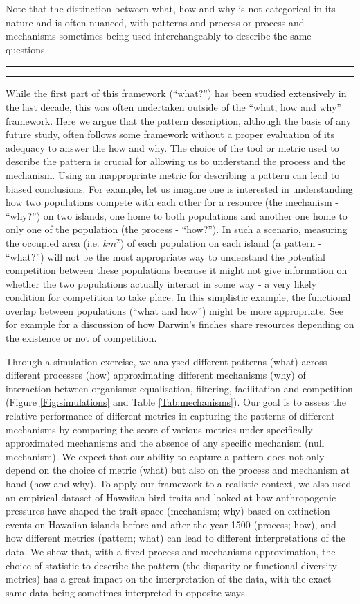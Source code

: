 \documentclass[12pt,letterpaper]{article}
\begin{document}
Note that the distinction between what, how and why is not categorical in its nature and is often nuanced, with patterns and process or process and mechanisms sometimes being used interchangeably to describe the same questions.

\bigskip
\hrule
\hrule
\bigskip

While the first part of this framework (``what?'') has been studied extensively in the last decade, this was often undertaken outside of the ``what, how and why'' framework.
Here we argue that the pattern description, although the basis of any future study, often follows some framework without a proper evaluation of its adequacy to answer the how and why.
The choice of the tool or metric used to describe the pattern is crucial for allowing us to understand the process and the mechanism.
Using an inappropriate metric for describing a pattern can lead to biased conclusions.
For example, let us imagine one is interested in understanding how two populations compete with each other for a resource (the mechanism - ``why?'') on two islands, one home to both populations and another one home to only one of the population (the process - ``how?'').
In such a scenario, measuring the occupied area (i.e. $km^{2}$) of each population on each island (a pattern - ``what?'') will not be the most appropriate way to understand the potential competition between these populations because it might not give information on whether the two populations actually interact in some way - a very likely condition for competition to take place.
In this simplistic example, the functional overlap between populations (``what and how'') might be more appropriate.
See for example \citealt{carvalho2020decomposing} for a discussion of how Darwin's finches share resources depending on the existence or not of competition.

Through a simulation exercise, we analysed different patterns (what) across different processes (how) approximating different mechanisms (why) of interaction between organisms: equalisation, filtering, facilitation and competition (Figure \ref{Fig:simulations} and Table \ref{Tab:mechanisms}).
Our goal is to assess the relative performance of different metrics in capturing the patterns of different mechanisms by comparing the score of various metrics under specifically approximated mechanisms and the absence of any specific mechanism (null mechanism).
We expect that our ability to capture a pattern does not only depend on the choice of metric (what) but also on the process and mechanism at hand (how and why).
To apply our framework to a realistic context, we also used an empirical dataset of Hawaiian bird traits and looked at how anthropogenic pressures have shaped the trait space (mechanism; why) based on extinction events on Hawaiian islands before and after the year 1500 (process; how), and how different metrics (pattern; what) can lead to different interpretations of the data.
We show that, with a fixed process and mechanisms approximation, the choice of statistic to describe the pattern (the disparity or functional diversity metrics) has a great impact on the interpretation of the data, with the exact same data being sometimes interpreted in opposite ways.
\end{document}
